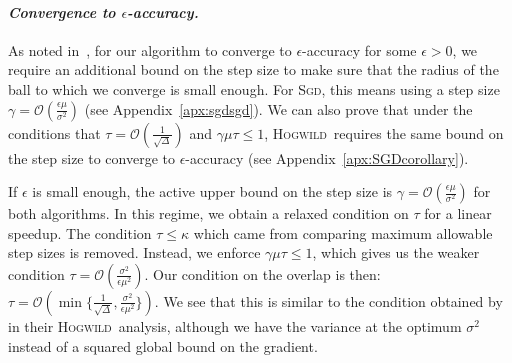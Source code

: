 \documentclass[twoside, 11pt]{article}
\newcommand{\stepsize}{\gamma}
\newcommand{\strongconvex}{\mu}
\newcommand{\overlap}{\tau}
\newcommand{\sparsity}{\Delta}
\newcommand{\Hogwild}{\textsc{Hogwild}}
\newcommand{\SGD}{\textsc{Sgd}}
\begin{document}
\paragraph{\textit{Convergence to $\epsilon$-accuracy.}}
As noted in~\citet{mania}, for our algorithm to converge to $\epsilon$-accuracy for some $\epsilon > 0$, we require an additional bound on the step size to make sure that the radius of the ball to which we converge is small enough.
For \SGD, this means using a step size $\stepsize = \mathcal{O}(\frac{\epsilon \strongconvex}{\sigma^2})$ (see Appendix~\ref{apx:sgdsgd}).
We can also prove that under the conditions that $\overlap = \mathcal{O}(\frac{1}{\sqrt{\sparsity}})$ and $\stepsize \strongconvex \overlap \leq 1$, \Hogwild\ requires the same bound on the step size to converge to $\epsilon$-accuracy (see Appendix~\ref{apx:SGDcorollary}).

If $\epsilon$ is small enough, the active upper bound on the step size is $\stepsize = \mathcal{O}(\frac{\epsilon \strongconvex}{\sigma^2})$ for both algorithms.
In this regime, we obtain a relaxed condition on $\overlap$ for a linear speedup.
The condition $\overlap \leq \kappa$ which came from comparing maximum allowable step sizes is removed.
Instead, we enforce $\stepsize \strongconvex \overlap \leq 1$, which gives us the weaker condition $\overlap = \mathcal{O}(\frac{\sigma^2}{\epsilon \strongconvex^2})$.
Our condition on the overlap is then: $\overlap = \mathcal{O}({\min\{\frac{1}{\sqrt{\sparsity}}}, \frac{\sigma^2}{\epsilon \strongconvex^2}\})$.
We see that this is similar to the condition obtained by~\citet[Theorem~4]{mania} in their \Hogwild\ analysis, although we have the variance at the optimum $\sigma^2$ instead of a squared global bound on the gradient.
\end{document}
